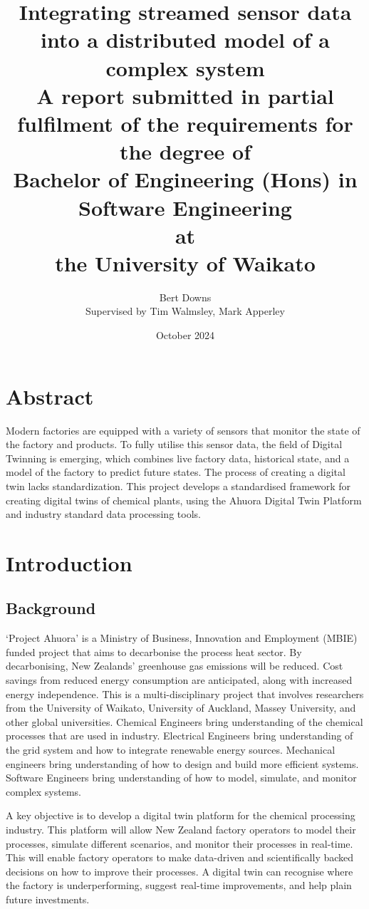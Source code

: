 \documentclass[12pt]{book}
\title{Integrating streamed sensor data into a distributed model of a complex system \\
\large{A report submitted in partial fulfilment of the requirements for the degree of \\
\textbf{Bachelor of Engineering (Hons) in Software Engineering} \\
at \\
\textbf{the University of Waikato}
}}
\author{Bert Downs  \\ 
Supervised by Tim Walmsley, Mark Apperley }
\date{October 2024}
\begin{document}
\maketitle


\chapter*{Abstract}

Modern factories are equipped with a variety of sensors that monitor the state of the factory and products. To fully utilise this sensor data, the field of Digital Twinning is emerging, which combines live factory data, historical state, and a model of the factory to predict future states. The process of creating a digital twin lacks standardization. This project develops a standardised framework for creating digital twins of chemical plants, using the Ahuora Digital Twin Platform and industry standard data processing tools. 


\tableofcontents

\newpage


\chapter{Introduction}


\section{Background}

`Project Ahuora' is a Ministry of Business, Innovation and Employment (MBIE) funded project that aims to decarbonise the process heat sector. 
By decarbonising, New Zealands' greenhouse gas emissions will be reduced. Cost savings from reduced energy consumption are anticipated, along with increased energy independence.
This is a multi-disciplinary project that involves researchers from the University of Waikato, University of Auckland, Massey University,
and other global universities. Chemical Engineers bring understanding of the chemical processes that are used in industry. Electrical Engineers bring understanding of the grid system
and how to integrate renewable energy sources. Mechanical engineers bring understanding of how to design and build more efficient systems. Software Engineers bring understanding of how to
model, simulate, and monitor complex systems. 

A key objective is to develop a digital twin platform for the chemical processing industry. This platform will allow New Zealand factory operators to model their processes, simulate different scenarios, and monitor their processes in real-time.
This will enable factory operators to make data-driven and scientifically backed decisions on how to improve their processes. A digital twin can recognise where the factory is underperforming, suggest real-time improvements, and help plain future investments.  
\end{document}
